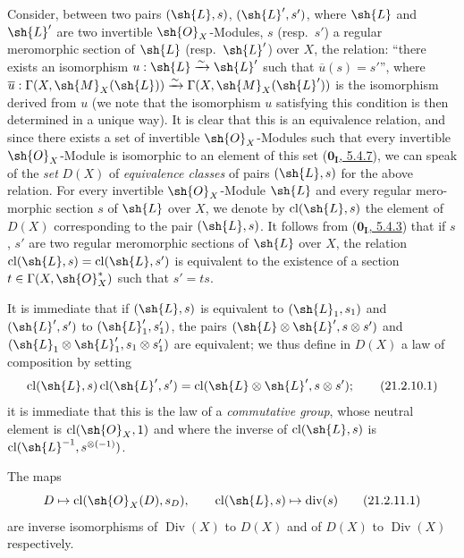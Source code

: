 \begin{env}[21.2.10]
\label{IV.21.2.10}
Consider, between two pairs $(\sh{L},s)$, $(\sh{L}',s')$, where $\sh{L}$ and $\sh{L}'$ are two invertible $\sh{O}_X$-Modules, $s$ (resp.\ $s'$) a regular meromorphic section of $\sh{L}$ (resp.\ $\sh{L}'$) over $X$, the relation:
``there exists an isomorphism $u:\sh{L}\xrightarrow{\sim}\sh{L}'$ such that $\overline{u}(s)=s'$'',
where $\overline{u}:\Gamma(X,\sh{M}_X(\sh{L}))\xrightarrow{\sim}\Gamma(X,\sh{M}_X(\sh{L}'))$ is the isomorphism derived from $u$ (we note that the isomorphism $u$ satisfying this condition is then determined in a unique way).
It is clear that this is an equivalence relation, and since there exists a set of invertible $\sh{O}_X$-Modules such that every invertible $\sh{O}_X$-Module is isomorphic to an element of this set (\hyperref[0.5.4.7]{$\mathbf{0_I}$, 5.4.7}), we can speak of the \emph{set} $D(X)$ of \emph{equivalence classes} of pairs $(\sh{L},s)$ for the above relation.
For every invertible $\sh{O}_X$-Module $\sh{L}$ and every regular mero-
morphic section $s$ of $\sh{L}$ over $X$, we denote by $\operatorname{cl}(\sh{L},s)$ the element of $D(X)$ corresponding to the pair $(\sh{L},s)$.
It follows from (\hyperref[0.5.4.3]{$\mathbf{0_I}$, 5.4.3}) that if $s$, $s'$ are two regular meromorphic sections of $\sh{L}$ over $X$, the relation $\operatorname{cl}(\sh{L},s)=\operatorname{cl}(\sh{L},s')$ is equivalent to the existence of a section $t\in\Gamma(X,\sh{O}_X^*)$ such that $s'=ts$.

It is immediate that if $(\sh{L},s)$ is equivalent to $(\sh{L}_1,s_1)$ and $(\sh{L}',s')$ to $(\sh{L}_1',s_1')$, the pairs $(\sh{L}\otimes\sh{L}',s\otimes s')$ and $(\sh{L}_1\otimes\sh{L}_1',s_1\otimes s_1')$ are equivalent;
we thus define in $D(X)$ a law of composition by setting
\[
\label{IV.21.2.10.1}
  \operatorname{cl}(\sh{L},s)\operatorname{cl}(\sh{L}',s')=\operatorname{cl}(\sh{L}\otimes\sh{L}',s\otimes s');
  \tag{21.2.10.1}
\]
it is immediate that this is the law of a \emph{commutative group}, whose neutral element is $\operatorname{cl}(\sh{O}_X,1)$ and where the inverse of $\operatorname{cl}(\sh{L},s)$ is $\operatorname{cl}(\sh{L}^{-1},s^{\otimes(-1)})$.
\end{env}

\begin{proposition}[21.2.11]
\label{IV.21.2.11}
The maps
\[
\label{IV.21.2.11.1}
  D\mapsto\operatorname{cl}(\sh{O}_X(D),s_D),\qquad \operatorname{cl}(\sh{L},s)\mapsto\operatorname{div}(s)
  \tag{21.2.11.1}
\]
are inverse isomorphisms of $\operatorname{Div}(X)$ to $D(X)$ and of $D(X)$ to $\operatorname{Div}(X)$ respectively.
\end{proposition}

